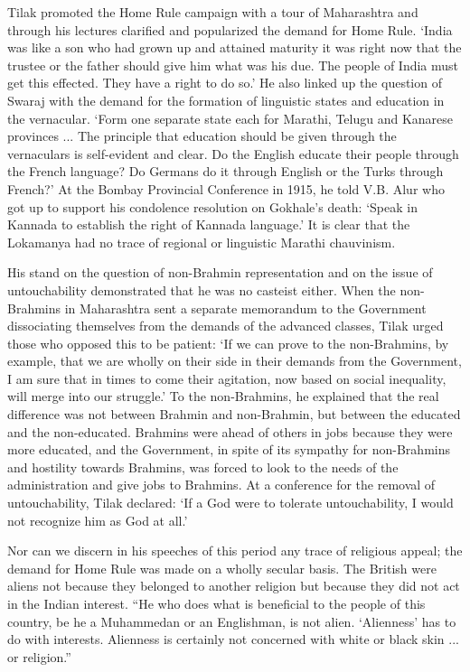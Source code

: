 \begin{multicols}{2}
Tilak promoted the Home Rule campaign with a tour of Maharashtra and through his lectures clarified and popularized the demand for Home Rule. `India was like a son who had grown up and attained maturity it was right now that the trustee or the father should give him what was his due. The people of India must get this effected. They have a right to do so.' He also linked up the question of Swaraj with the demand for the formation of linguistic states and education in the vernacular. `Form one separate state each for Marathi, Telugu and Kanarese provinces ... The principle that education should be given through the vernaculars is self-evident and clear. Do the English educate their people through the French language? Do Germans do it through English or the Turks through French?' At the Bombay Provincial Conference in 1915, he told V.B. Alur who got up to support his condolence resolution on Gokhale's death: `Speak in Kannada to establish the right of Kannada language.' It is clear that the Lokamanya had no trace of regional or linguistic Marathi chauvinism.

His stand on the question of non-Brahmin representation and on the issue of untouchability demonstrated that he was no casteist either. When the non-Brahmins in Maharashtra sent a separate memorandum to the Government dissociating themselves from the demands of the advanced classes, Tilak urged those who opposed this to be patient: `If we can prove to the non-Brahmins, by example, that we are wholly on their side in their demands from the Government, I am sure that in times to come their agitation, now based on social inequality, will merge into our struggle.' To the non-Brahmins, he explained that the real difference was not between Brahmin and non-Brahmin, but between the educated and the non-educated. Brahmins were ahead of others in jobs because they were more educated, and the Government, in spite of its sympathy for non-Brahmins and hostility towards Brahmins, was forced to look to the needs of the administration and give jobs to Brahmins. At a conference for the removal of untouchability, Tilak declared: `If a God were to tolerate untouchability, I would not recognize him as God at all.'

Nor can we discern in his speeches of this period any trace of religious appeal; the demand for Home Rule was made on a wholly secular basis. The British were aliens not because they belonged to another religion but because they did not act in the Indian interest. ``He who does what is beneficial to the people of this country, be he a Muhammedan or an Englishman, is not alien. `Alienness' has to do with interests. Alienness is certainly not concerned with white or black skin ... or religion.''


\end{multicols}
